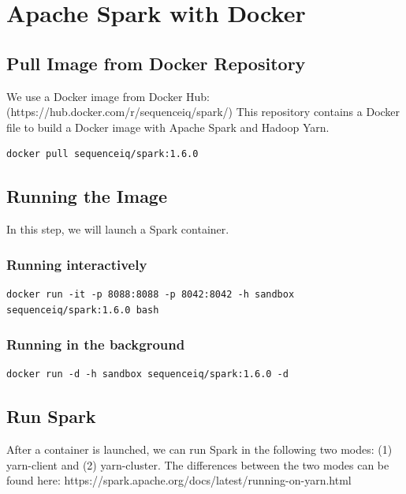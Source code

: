 
\FILENAME

\section{Apache Spark with Docker}\label{s:apache-spark-with-docker}

\subsection{Pull Image from Docker
Repository}

We use a Docker image from Docker Hub:
(https://hub.docker.com/r/sequenceiq/spark/) This repository contains a
Docker file to build a Docker image with Apache Spark and Hadoop Yarn.

\begin{lstlisting}
docker pull sequenceiq/spark:1.6.0
\end{lstlisting}

\subsection{Running the Image}

In this step, we will launch a Spark container.

\subsubsection{Running interactively}

\begin{lstlisting}
docker run -it -p 8088:8088 -p 8042:8042 -h sandbox sequenceiq/spark:1.6.0 bash
\end{lstlisting}

\subsubsection{Running in the
background}

\begin{lstlisting}
docker run -d -h sandbox sequenceiq/spark:1.6.0 -d
\end{lstlisting}

\subsection{Run Spark}

After a container is launched, we can run Spark in the following two
modes: (1) yarn-client and (2) yarn-cluster. The differences between the
two modes can be found here:
https://spark.apache.org/docs/latest/running-on-yarn.html

